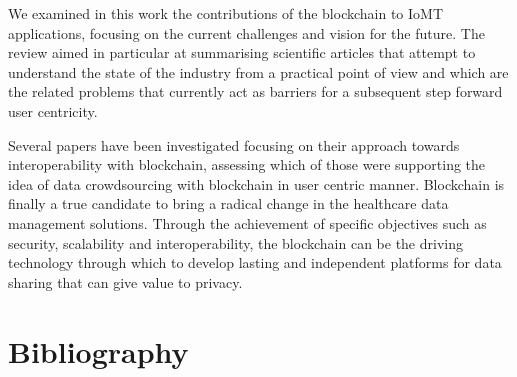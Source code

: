 \documentclass[preprint]{elsarticle}
\begin{document}
We examined in this work the contributions of the blockchain to IoMT applications, focusing on the current challenges and vision for the future. The review aimed in particular at summarising scientific articles that attempt to understand the state of the industry from a practical point of view and which are the related problems that currently act as barriers for a subsequent step forward user centricity. 

Several papers have been investigated focusing on their approach towards interoperability with blockchain, assessing which of those were supporting the idea of data crowdsourcing with blockchain in user centric manner. Blockchain is finally a true candidate to bring a radical change in the healthcare data management solutions. Through the achievement of specific objectives such as security, scalability and interoperability, the blockchain can be the driving technology through which to develop lasting and independent platforms for data sharing that can give value to privacy.

\section*{Bibliography}


\end{document}
